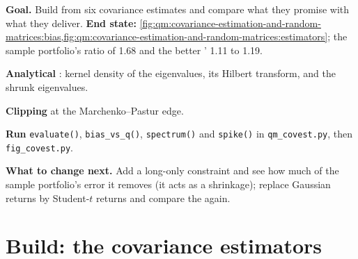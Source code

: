 \begin{tutorial}
\textbf{Goal.} Build  from six covariance estimates and compare what they promise with what they deliver.
\textbf{End state:} \cref{fig:qm:covariance-estimation-and-random-matrices:bias,fig:qm:covariance-estimation-and-random-matrices:estimators}; the sample portfolio's ratio of 1.68 and
the better ' 1.11 to 1.19.
\begin{tutsteps}
\item \textbf{Analytical }: kernel density of the eigenvalues, its Hilbert transform, and the shrunk eigenvalues.
\label{lst:qm:covariance-estimation-and-random-matrices:nl}
\item \textbf{Clipping} at the Marchenko--Pastur edge.
\label{lst:qm:covariance-estimation-and-random-matrices:clip}
\item \textbf{Run} \texttt{evaluate()}, \texttt{bias\_vs\_q()}, \texttt{spectrum()} and \texttt{spike()} in \texttt{qm\_covest.py}, then \texttt{fig\_covest.py}.
\end{tutsteps}
\textbf{What to change next.} Add a long-only constraint and see how much of the sample portfolio's error it removes (it acts as a shrinkage); replace Gaussian returns by Student-$t$
returns and compare the  again.
\end{tutorial}

\section{Build: the covariance estimators}\label{bld:qm:covariance-estimation-and-random-matrices:covest}

